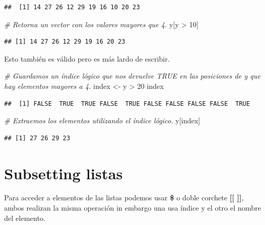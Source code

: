 \documentclass[
  12pt,
]{book}
\newenvironment{Shaded}{\begin{snugshade}}{\end{snugshade}}
\newcommand{\CommentTok}[1]{\textcolor[rgb]{0.56,0.35,0.01}{\textit{#1}}}
\newcommand{\DecValTok}[1]{\textcolor[rgb]{0.00,0.00,0.81}{#1}}
\newcommand{\NormalTok}[1]{#1}
\newcommand{\OtherTok}[1]{\textcolor[rgb]{0.56,0.35,0.01}{#1}}
\newcommand{\SpecialCharTok}[1]{\textcolor[rgb]{0.00,0.00,0.00}{#1}}
\begin{document}
\begin{verbatim}
##  [1] 14 27 26 12 29 19 16 10 20 23
\end{verbatim}

\begin{Shaded}
\begin{Highlighting}[]
\CommentTok{\# Retorna un vector con los valores mayores que 4.}
\NormalTok{y[y }\SpecialCharTok{\textgreater{}} \DecValTok{10}\NormalTok{]}
\end{Highlighting}
\end{Shaded}

\begin{verbatim}
## [1] 14 27 26 12 29 19 16 20 23
\end{verbatim}

Esto también es válido pero es más lardo de escribir.

\begin{Shaded}
\begin{Highlighting}[]
\CommentTok{\# Guardamos un índice lógico que nos devuelve TRUE en las posiciones de y que hay elementos mayores a 4.}
\NormalTok{index }\OtherTok{\textless{}{-}}\NormalTok{ y }\SpecialCharTok{\textgreater{}} \DecValTok{20}
\NormalTok{index}
\end{Highlighting}
\end{Shaded}

\begin{verbatim}
##  [1] FALSE  TRUE  TRUE FALSE  TRUE FALSE FALSE FALSE FALSE  TRUE
\end{verbatim}

\begin{Shaded}
\begin{Highlighting}[]
\CommentTok{\# Extraemos los elementos utilizando el índice lógico.}
\NormalTok{y[index]}
\end{Highlighting}
\end{Shaded}

\begin{verbatim}
## [1] 27 26 29 23
\end{verbatim}

\hypertarget{subsetting-listas}{%
\section{\texorpdfstring{\textbf{Subsetting listas}}{Subsetting listas}}\label{subsetting-listas}}

Para acceder a elementos de las listas podemos usar \textbf{\$} o doble corchete \textbf{{[}{[} {]}{]}}, ambos realizan la misma operación in embargo una usa índice y el otro el nombre del elemento.
\end{document}
